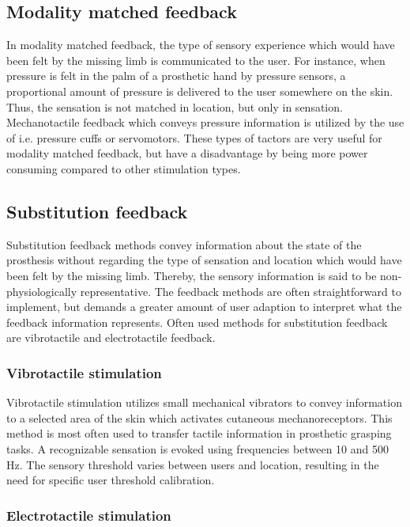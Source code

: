 \subsection{Modality matched feedback}

In modality matched feedback, the type of sensory experience which would have been felt by the missing limb is communicated to the user. For instance, when pressure is felt in the palm of a prosthetic hand by pressure sensors, a proportional amount of pressure is delivered to the user somewhere on the skin. Thus, the sensation is not matched in location, but only in sensation. Mechanotactile feedback which conveys pressure information is utilized by the use of i.e. pressure cuffs or servomotors. These types of tactors are very useful for modality matched feedback, but have a disadvantage by being more power consuming compared to other stimulation types. \cite{Schofield2014,Antfolk2018} 

\subsection{Substitution feedback}

Substitution feedback methods convey information about the state of the prosthesis without regarding the type of sensation and location which would have been felt by the missing limb. Thereby, the sensory information is said to be non-physiologically representative. The feedback methods are often straightforward to implement, but demands a greater amount of user adaption to interpret what the feedback information represents. Often used methods for substitution feedback are vibrotactile and electrotactile feedback. \cite{Schofield2014,Antfolk2018}     

\subsubsection{Vibrotactile stimulation}

Vibrotactile stimulation utilizes small mechanical vibrators to convey information to a selected area of the skin which activates cutaneous mechanoreceptors. This method is most often used to transfer tactile information in prosthetic grasping tasks. \cite{Schofield2014} A recognizable sensation is evoked using frequencies between 10 and 500 Hz. The sensory threshold varies between users and location, resulting in the need for specific user threshold calibration. \cite{Antfolk2018}  


\subsubsection{Electrotactile stimulation} \label{E-stim}

